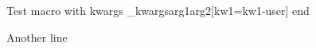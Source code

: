 \documentclass{article}
\author{Macro Kwarg Test}
\begin{document}
	Test macro with kwargs \pym\macro_kwargs{arg1}{arg2}[kw1=kw1-user] end

	Another line
	
\end{document}
